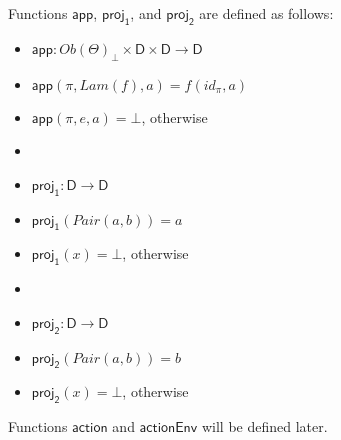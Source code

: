 \documentclass{amsart}
\theoremstyle{definition}
\theoremstyle{remark}
\newcommand{\D}{\mathsf{D}}
\numberwithin{table}{section}
\begin{document}
Functions $\mathsf{app}$, $\mathsf{proj_1}$, and $\mathsf{proj_2}$ are defined as follows:
\begin{itemize}
\item[] $\mathsf{app} : Ob(\Theta)_\bot \times \D \times \D \to \D$
\item[] $\mathsf{app}(\pi,Lam(f),a) = f(id_\pi,a)$
\item[] $\mathsf{app}(\pi,e,a) = \bot$, otherwise
\item[]
\item[] $\mathsf{proj_1} : \D \to \D$
\item[] $\mathsf{proj_1}(Pair(a,b)) = a$
\item[] $\mathsf{proj_1}(x) = \bot$, otherwise
\item[]
\item[] $\mathsf{proj_2} : \D \to \D$
\item[] $\mathsf{proj_2}(Pair(a,b)) = b$
\item[] $\mathsf{proj_2}(x) = \bot$, otherwise
\end{itemize}

Functions $\mathsf{action}$ and $\mathsf{actionEnv}$ will be defined later. %



\end{document}

